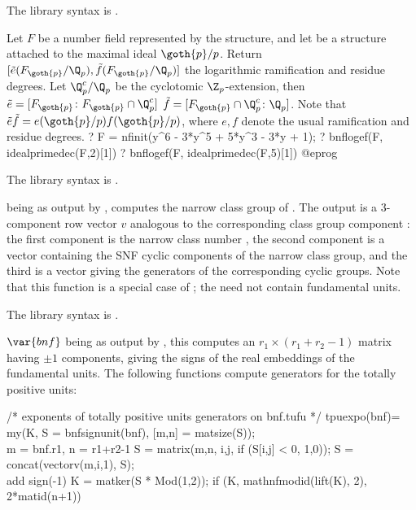 The library syntax is .

\label{se:bnflogef}
Let $F$ be a number field represented by the  structure,
and let  be a  structure attached to the
maximal ideal $\goth{p} / p$. Return
$[\tilde{e}(F_\goth{p} / \Q_p), \tilde{f}(F_\goth{p} / \Q_p)]$
the logarithmic ramification and residue degrees. Let $\Q_p^c/\Q_p$ be the
cyclotomic $\Z_p$-extension, then
$\tilde{e} = [F_\goth{p} \colon F_\goth{p} \cap \Q_p^c]$
$\tilde{f} = [F_\goth{p} \cap \Q_p^c \colon \Q_p]$. Note that
$\tilde{e}\tilde{f} = e(\goth{p}/p) f(\goth{p}/p)$, where $e,f$ denote the
usual ramification and residue degrees.
\bprog
? F = nfinit(y^6 - 3*y^5 + 5*y^3 - 3*y + 1);
? bnflogef(F, idealprimedec(F,2)[1])
? bnflogef(F, idealprimedec(F,5)[1])
@eprog

The library syntax is .

\label{se:bnfnarrow}
 being as output by
, computes the narrow class group of . The output is
a 3-component row vector $v$ analogous to the corresponding class group
component : the first component
is the narrow class number , the second component is a vector
containing the SNF cyclic components  of
the narrow class group, and the third is a vector giving the generators of
the corresponding  cyclic groups. Note that this function is a
special case of ; the  need not contain fundamental
units.

The library syntax is .

\label{se:bnfsignunit}
$\var{bnf}$ being as output by
, this computes an $r_1\times(r_1+r_2-1)$ matrix having $\pm1$
components, giving the signs of the real embeddings of the fundamental units.
The following functions compute generators for the totally positive units:

\bprog
/* exponents of totally positive units generators on bnf.tufu */
tpuexpo(bnf)=
{ my(K, S = bnfsignunit(bnf), [m,n] = matsize(S));
  \\ m = bnf.r1, n = r1+r2-1
  S = matrix(m,n, i,j, if (S[i,j] < 0, 1,0));
  S = concat(vectorv(m,i,1), S);   \\ add sign(-1)
  K = matker(S * Mod(1,2));
  if (K, mathnfmodid(lift(K), 2), 2*matid(n+1))
}

